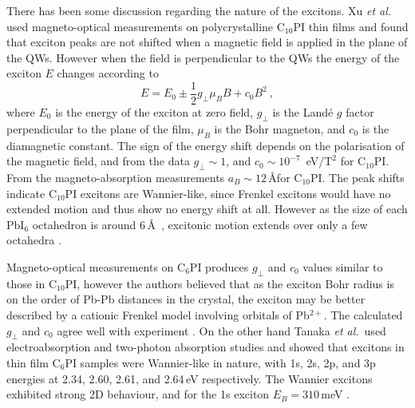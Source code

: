 There has been some discussion regarding the nature of the excitons. Xu \textit{et al.} used magneto-optical measurements on polycrystalline $\textrm{C}_{10}$PI thin films and found that exciton peaks are not shifted when a magnetic field is applied in the plane of the QWs. However when the field is perpendicular to the QWs the energy of the exciton $E$ changes according to
\begin{equation}
E = E_0 \pm \frac{1}{2} g_{\bot} \mu_{B} B + c_0 B^2~,
\label{mag-shift}
\end{equation} 
where $E_0$ is the energy of the exciton at zero field, $g_{\bot}$ is the Land\'{e} $g$ factor perpendicular to the plane of the film, $\mu_B$ is the Bohr magneton, and $c_0$ is the diamagnetic constant. The sign of the energy shift depends on the polarisation of the magnetic field, and from the data $g_{\bot}\sim1$, and $c_0\sim 10^{-7}$~eV/$\textrm{T}^2$ for C$_{10}$PI. From the magneto-absorption measurements $a_B \sim12\,$\AA for $\textrm{C}_{10}$PI. The peak shifts indicate $\textrm{C}_{10}$PI excitons are Wannier-like, since Frenkel excitons would have no extended motion and thus show no energy shift at all. However as the size of each $\textrm{PbI}_6$ octahedron is around 6\,\AA~\cite{Ishihara1990}, excitonic motion extends over only a few octahedra \cite{Xu1991b}.

Magneto-optical measurements on C$_6$PI produces $g_{\bot}$ and $c_0$ values similar to those in $\textrm{C}_{10}$PI, however the authors believed that as the exciton Bohr radius is on the order of Pb-Pb distances in the crystal, the exciton may be better described by a cationic Frenkel model involving orbitals of Pb$^{2+}$. The calculated $g_{\bot}$ and $c_0$ agree well with experiment \cite{Kataoka1993}. On the other hand Tanaka \textit{et al.}\ used electroabsorption and two-photon absorption studies and showed that excitons in thin film $\textrm{C}_{6}$PI samples were Wannier-like in nature, with 1s, 2s, 2p, and 3p energies at 2.34, 2.60, 2.61, and 2.64\,eV respectively. The Wannier excitons exhibited strong 2D behaviour, and for the 1s exciton $E_B = 310$\,meV \cite{Tanaka2002}.


